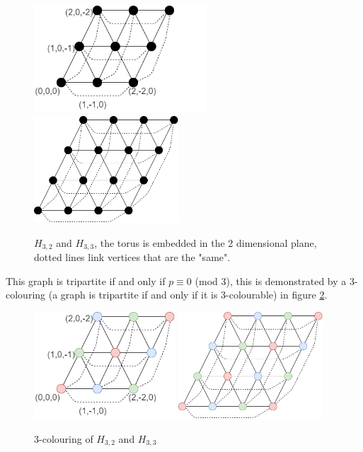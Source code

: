 \documentclass[a4paper,11pt]{report}
\newcounter{col}
\begin{document}
\begin{figure}[h!]
\begin{center}
\includegraphics[height=40mm]{figures/holyer_coord.png}
\includegraphics[height=40mm]{figures/holyer_3_4.png}
\end{center}
\caption{$H_{3,2} $ and $H_{3,3}$, the torus is embedded in the 2 dimensional plane, dotted lines link vertices that are the "same".}
\label{holyer}
\end{figure}

This graph is tripartite if and only if $p\equiv 0 $ (mod 3), this is demonstrated by a 3-colouring (a graph is tripartite if and only if it is 3-colourable) in figure \ref{holyercolour}.

\begin{figure}[h!]
\begin{center}
\includegraphics[height=40mm]{figures/colour_holyer_coord.png}
\includegraphics[height=40mm]{figures/colour_holyer.png}
\end{center}
\caption{3-colouring of $H_{3,2} $ and $H_{3,3}$ }
\label{holyercolour}
\end{figure}
\end{document}

